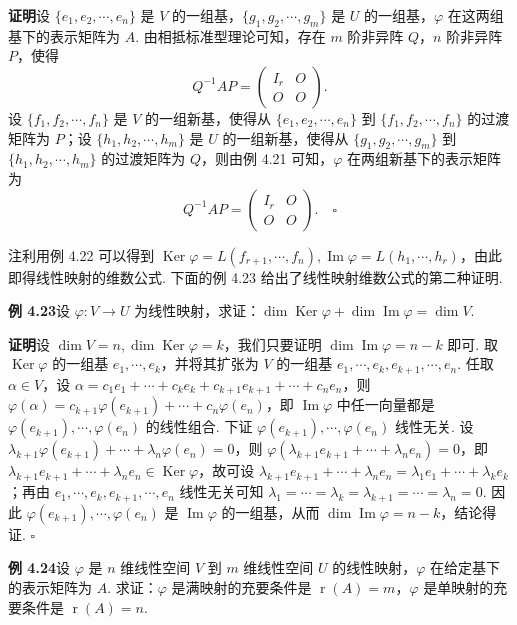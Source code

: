 \documentclass[UTF8, 12pt, fontset=fandol, oneside]{ctexart}
\begin{document}
\noindent\textbf{证明}\quad 设 $\{e_1,e_2,\cdots,e_n\}$ 是 $V$ 的一组基，$\{g_1,g_2,\cdots,g_m\}$ 是 $U$ 的一组基，$\varphi$ 在这两组基下的表示矩阵为 $A$. 由相抵标准型理论可知，存在 $m$ 阶非异阵 $Q$，$n$ 阶非异阵 $P$，使得
\[
Q^{-1}AP=\left(\begin{array}{cc}
I_r & O\\
O & O
\end{array}\right).
\]
设 $\{f_1,f_2,\cdots,f_n\}$ 是 $V$ 的一组新基，使得从 $\{e_1,e_2,\cdots,e_n\}$ 到 $\{f_1,f_2,\cdots,f_n\}$ 的过渡矩阵为 $P$；设 $\{h_1,h_2,\cdots,h_m\}$ 是 $U$ 的一组新基，使得从 $\{g_1,g_2,\cdots,g_m\}$ 到 $\{h_1,h_2,\cdots,h_m\}$ 的过渡矩阵为 $Q$，则由例 4.21 可知，$\varphi$ 在两组新基下的表示矩阵为
\[
Q^{-1}AP=\left(\begin{array}{cc}
I_r & O\\
O & O
\end{array}\right). \quad \square
\]

注\quad 利用例 4.22 可以得到 $\operatorname{Ker}\varphi=L(f_{r+1},\cdots,f_n),\operatorname{Im}\varphi=L(h_1,\cdots,h_r)$，由此即得线性映射的维数公式. 下面的例 4.23 给出了线性映射维数公式的第二种证明.

\noindent\textbf{例 4.23}\quad 设 $\varphi:V\to U$ 为线性映射，求证：$\dim\operatorname{Ker}\varphi+\dim\operatorname{Im}\varphi=\dim V$.

\noindent\textbf{证明}\quad 设 $\dim V=n,\dim\operatorname{Ker}\varphi=k$，我们只要证明 $\dim\operatorname{Im}\varphi=n-k$ 即可. 取 $\operatorname{Ker}\varphi$ 的一组基 $e_1,\cdots,e_k$，并将其扩张为 $V$ 的一组基 $e_1,\cdots,e_k,e_{k+1},\cdots,e_n$. 任取 $\alpha\in V$，设 $\alpha=c_1e_1+\cdots+c_ke_k+c_{k+1}e_{k+1}+\cdots+c_ne_n$，则 $\varphi(\alpha)=c_{k+1}\varphi(e_{k+1})+\cdots+c_n\varphi(e_n)$，即 $\operatorname{Im}\varphi$ 中任一向量都是 $\varphi(e_{k+1}),\cdots,\varphi(e_n)$ 的线性组合. 下证 $\varphi(e_{k+1}),\cdots,\varphi(e_n)$ 线性无关. 设 $\lambda_{k+1}\varphi(e_{k+1})+\cdots+\lambda_n\varphi(e_n)=0$，则 $\varphi(\lambda_{k+1}e_{k+1}+\cdots+\lambda_ne_n)=0$，即 $\lambda_{k+1}e_{k+1}+\cdots+\lambda_ne_n\in\operatorname{Ker}\varphi$，故可设 $\lambda_{k+1}e_{k+1}+\cdots+\lambda_ne_n=\lambda_1e_1+\cdots+\lambda_ke_k$；再由 $e_1,\cdots,e_k,e_{k+1},\cdots,e_n$ 线性无关可知 $\lambda_1=\cdots=\lambda_k=\lambda_{k+1}=\cdots=\lambda_n=0$. 因此 $\varphi(e_{k+1}),\cdots,\varphi(e_n)$ 是 $\operatorname{Im}\varphi$ 的一组基，从而 $\dim\operatorname{Im}\varphi=n-k$，结论得证. $\square$

\noindent\textbf{例 4.24}\quad 设 $\varphi$ 是 $n$ 维线性空间 $V$ 到 $m$ 维线性空间 $U$ 的线性映射，$\varphi$ 在给定基下的表示矩阵为 $A$. 求证：$\varphi$ 是满映射的充要条件是 $\operatorname{r}(A)=m$，$\varphi$ 是单映射的充要条件是 $\operatorname{r}(A)=n$.
\end{document}
